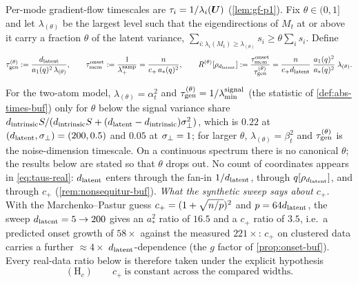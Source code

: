 \begin{definition}\label{def:ratio-real}
Per-mode gradient-flow timescales are $\tau_i=1/\lambda_i(\bm{U})$ (\cref{lem:gf-p1}). Fix $\theta\in(0,1]$ and let $\lambda_{(\theta)}$ be the largest level such that the eigendirections of $M_t$ at or above it carry a fraction $\theta$ of the latent variance, $\sum_{i:\lambda_i(M_t)\ge\lambda_{(\theta)}}s_i\ge\theta\sum_is_i$. Define
\begin{equation}\label{eq:taus-real}
\tau_{\mathrm{gen}}^{(\theta)}:=\frac{d_{\mathrm{latent}}}{a_1(q)^2\,\lambda_{(\theta)}},\qquad
\tau_{\mathrm{mem}}^{\mathrm{onset}}:=\frac1{\lambda_+^{\mathrm{samp}}}=\frac{n}{c_+\,a_\ast(q)^2},\qquad
R^{(\theta)}[\rho_{d_{\mathrm{latent}}}]:=\frac{\tau_{\mathrm{mem}}^{\mathrm{onset}}}{\tau_{\mathrm{gen}}^{(\theta)}}=\frac{n}{c_+d_{\mathrm{latent}}}\;\frac{a_1(q)^2}{a_\ast(q)^2}\;\lambda_{(\theta)} .
\end{equation}
\end{definition}
For the two-atom model, $\lambda_{(\theta)}=\alpha_t^2$ and $\tau_{\mathrm{gen}}^{(\theta)}=1/\lambda^{\mathrm{signal}}_{\min}$ (the statistic of \cref{def:abs-times-buf}) only for $\theta$ below the signal variance share $d_{\mathrm{intrinsic}} S/(d_{\mathrm{intrinsic}} S+(d_{\mathrm{latent}}-d_{\mathrm{intrinsic}})\sigma_{\perp}^2)$, which is $0.22$ at $(d_{\mathrm{latent}},\sigma_{\perp})=(200,0.5)$ and $0.05$ at $\sigma_{\perp}=1$; for larger $\theta$, $\lambda_{(\theta)}=\beta_t^2$ and $\tau_{\mathrm{gen}}^{(\theta)}$ is the noise-dimension timescale. On a continuous spectrum there is no canonical $\theta$; the results below are stated so that $\theta$ drops out. No count of coordinates appears in \eqref{eq:taus-real}: $d_{\mathrm{latent}}$ enters through the fan-in $1/d_{\mathrm{latent}}$, through $q[\rho_{d_{\mathrm{latent}}}]$, and through $c_+$ (\cref{rem:nonsequitur-buf}). \emph{What the synthetic sweep says about $c_+$.} With the Marchenko--Pastur guess $c_+=(1+\sqrt{n/p})^2$ and $p=64d_{\mathrm{latent}}$, the sweep $d_{\mathrm{latent}}=5\to200$ gives an $a_\ast^2$ ratio of $16.5$ and a $c_+$ ratio of $3.5$, i.e.\ a predicted onset growth of $58\times$ against the measured $221\times$: $c_+$ on clustered data carries a further $\approx4\times$ $d_{\mathrm{latent}}$-dependence (the $g$ factor of \cref{prop:onset-buf}). Every real-data ratio below is therefore taken under the explicit hypothesis
\begin{equation}\label{eq:Hc-real}
(\mathrm H_c)\qquad c_+\ \text{is constant across the compared widths.}
\end{equation}

